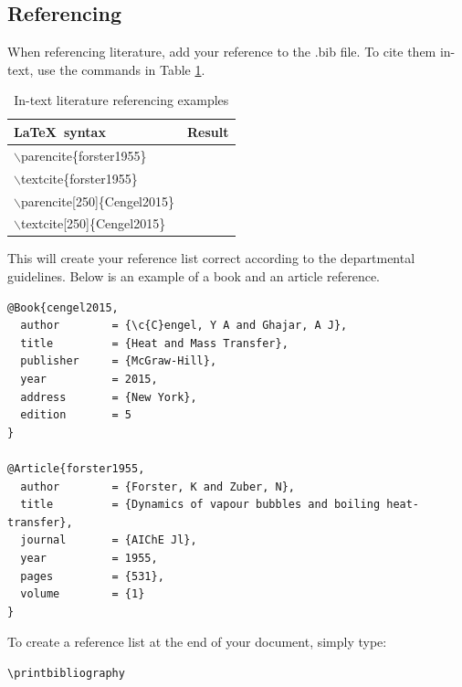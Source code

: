 \documentclass[a4paper,12pt]{article}
\begin{document}
\subsection{Referencing}


When referencing literature, add your reference to the .bib file. To cite them in-text, use the commands in Table \ref{tab:Cite}.

\begin{table}[!ht]
\centering
\caption{In-text literature referencing examples}
\label{tab:Cite}
\begin{tabular}{ll}
\toprule
\LaTeX\ syntax & Result\\
\midrule
$\backslash$parencite\{forster1955\} &\parencite{forster1955} \\
$\backslash$textcite\{forster1955\} & \textcite{forster1955} \\
$\backslash$parencite[250]\{Cengel2015\} &\parencite[250]{Cengel2015} \\
$\backslash$textcite[250]\{Cengel2015\} & \textcite[250]{Cengel2015} \\
\bottomrule
\end{tabular}
\end{table}

This will create your reference list correct according to the departmental guidelines. Below is an example of a book and an article reference.

\begin{lstlisting}
@Book{cengel2015,
  author		= {\c{C}engel, Y A and Ghajar, A J},
  title			= {Heat and Mass Transfer},
  publisher		= {McGraw-Hill},
  year			= 2015,
  address		= {New York},
  edition		= 5
}

@Article{forster1955,
  author		= {Forster, K and Zuber, N},
  title			= {Dynamics of vapour bubbles and boiling heat-transfer},
  journal		= {AIChE Jl},
  year			= 1955,
  pages			= {531},
  volume		= {1}
}
\end{lstlisting}

To create a reference list at the end of your document, simply type: 
\begin{lstlisting}
\printbibliography
\end{lstlisting} 
\nocite{*}

\printbibliography
\newpage
\appendix
\renewcommand{\thefigure}{\thesection.\arabic{figure}}
\renewcommand{\thetable}{\thesection.\arabic{table}}
\renewcommand{\thepage}{\thesection.\arabic{page}}
\end{document}
